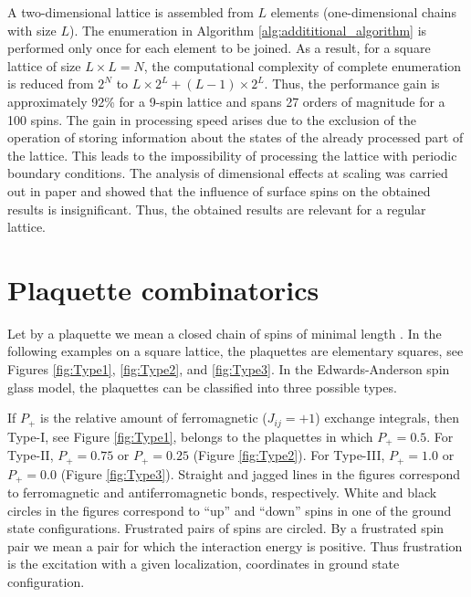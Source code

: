 \documentclass[preprint,12pt]{elsarticle}
\begin{document}
	A two-dimensional lattice is assembled from $L$ elements (one-dimensional chains with size $L$). The enumeration in Algorithm \ref{alg:addititional_algorithm} is performed only once for each element to be joined. As a result, for a square lattice of size $L \times L = N$, the computational complexity of complete enumeration is reduced from $2^{N}$ to $L \times 2^L + (L - 1) \times 2^L$. Thus, the performance gain is approximately 92\% for a 9-spin lattice and spans 27 orders of magnitude for a 100 spins. The gain in processing speed arises due to the exclusion of the operation of storing information about the states of the already processed part of the lattice. This leads to the impossibility of processing the lattice with periodic boundary conditions. The analysis of dimensional effects at scaling was carried out in paper \cite{trukhin2024thermodynamic} and showed that the influence of surface spins on the obtained results is insignificant. Thus, the obtained results are relevant for a regular lattice.
	
	\section{Plaquette combinatorics}
	
	Let by a plaquette we mean a closed chain of spins of minimal length \cite{lebrecht2015j}. In the following examples on a square lattice, the plaquettes are elementary squares, see Figures \ref{fig:Type1}, \ref{fig:Type2}, and \ref{fig:Type3}. In the Edwards-Anderson spin glass model, the plaquettes can be classified into three possible types. 
	
	If $P_+$ is the relative amount of ferromagnetic ($J_{ij}=+1$) exchange integrals, then Type-I, see Figure \ref{fig:Type1}, belongs to the plaquettes in which $P_+=0.5$. For Type-II, $P_+=0.75$ or $P_+=0.25$ (Figure \ref{fig:Type2}). For Type-III, $P_+=1.0$ or $P_+=0.0$ (Figure \ref{fig:Type3}). Straight and jagged lines in the figures correspond to ferromagnetic and antiferromagnetic bonds, respectively. White and black circles in the figures correspond to ``up'' and ``down'' spins in one of the ground state configurations. Frustrated pairs of spins are circled. By a frustrated spin pair we mean a pair for which the interaction energy is positive. Thus frustration is the excitation with a given localization, coordinates in ground state configuration.
	
\end{document}
